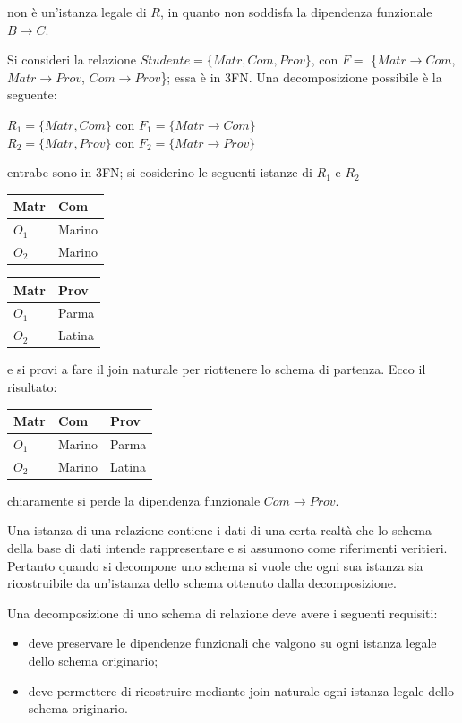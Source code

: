     non è un'istanza legale di $R$, in quanto non soddisfa la dipendenza funzionale
    $B\rightarrow C$.
 \label{esempio_4_2}
 \begin{exmp}
  Si consideri la relazione $Studente = \{Matr, Com, Prov\}$, con $F = $ \{$Matr\rightarrow Com$,
  $Matr\rightarrow Prov$, $Com\rightarrow Prov$\}; essa è in 3FN. Una decomposizione possibile è
  la seguente:
  \begin{center}
    $R_1 = \{Matr, Com\}$ con $F_1 = \{Matr\rightarrow Com\}$ \\
    $R_2 = \{Matr, Prov\}$ con $F_2 = \{Matr\rightarrow Prov\}$ \\
   \end{center}
  entrabe sono in 3FN; si cosiderino le seguenti istanze di $R_1$ e $R_2$
  \begin{multicols}{2}
  \begin{flushright} 
  \begin{tabular}{l | l }
  Matr & Com\\
  \hline
  $O_1$ & Marino\\
  $O_2$ & Marino
 \end{tabular}
 \end{flushright}
  
  \begin{flushleft}
   \begin{tabular}{ l | l}
  Matr & Prov \\
  \hline
  $O_1$ & Parma\\
  $O_2$ & Latina
 \end{tabular}
\end{flushleft}
\end{multicols}
e si provi a fare il join naturale per riottenere lo schema di partenza. Ecco il
risultato:
  \begin{center} 
  \begin{tabular}{l | l | l}
  Matr & Com & Prov\\
  \hline
  $O_1$ & Marino & Parma\\
  $O_2$ & Marino & Latina
 \end{tabular}
 \end{center}
 
 chiaramente si perde la dipendenza funzionale $Com\rightarrow Prov$.
\end{exmp}
Una istanza di una relazione contiene i dati di una certa realtà che lo schema della 
base di dati intende rappresentare e si assumono come riferimenti veritieri. Pertanto 
quando si decompone uno schema si vuole che ogni sua istanza sia ricostruibile da 
un'istanza dello schema ottenuto dalla decomposizione.
\begin{prop}
Una decomposizione di uno schema di relazione deve avere i seguenti requisiti:
\begin{itemize}
 \item deve preservare le dipendenze funzionali che valgono su ogni istanza legale dello 
 schema originario;
 \item deve permettere di ricostruire mediante join naturale ogni istanza legale 
 dello schema originario.
\end{itemize} 
\end{prop}

